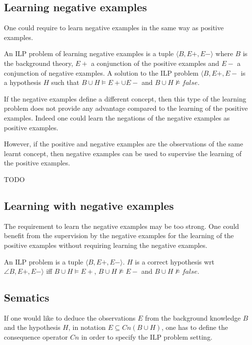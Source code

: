 \subsection{Learning negative examples}
One could require to learn negative examples in the same way as positive examples.
\begin{defn}
An ILP problem of learning negative examples is a tuple $\langle B, E+, E- \rangle$ where $B$ is the background theory, $E+$ a conjunction of the positive examples and $E-$ a conjunction of negative examples. A solution to the ILP problem $\langle B, E+, E-$ is a hypothesis $H$ such that
$B \cup H \models E+ \cup E-$ and $B \cup H \not\models false$.
\end{defn}
If the negative examples define a different concept, then this type of the learning problem does not provide any advantage compared to the learning of the positive examples. Indeed one could learn the negations of the negative examples as positive examples.

However, if the positive and negative examples are the observations of the same learnt concept, then negative examples can be used to supervise the learning of the positive examples.

\begin{exmp}
TODO
\end{exmp}

\subsection{Learning with negative examples}
The requirement to learn the negative examples may be too strong. One could benefit from the supervision by the negative examples for the learning of the positive examples without requiring learning the negative examples.

\begin{defn}
An ILP problem is a tuple $\langle B, E+, E- \rangle$. $H$ is a correct hypothesis wrt $\angle B, E+, E- \rangle$ iff
$B \cup H \models E+$, $B \cup H \not\models E-$ and $B \cup H \not\models false$.
\end{defn}

\subsection{Sematics}
If one would like to deduce the observations $E$ from the background knowledge $B$ and the hypothesis $H$, in notation $E \subseteq Cn(B \cup H)$, one has to define the consequence operator $Cn$ in order to specify the ILP problem setting.


